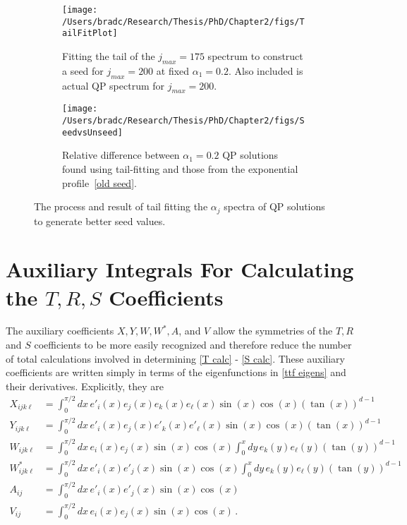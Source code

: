 \documentclass[../PhD.tex]{subfiles}
\begin{document}
\begin{subappendices}
\begin{figure}[ht]
	\centering
	\begin{subfigure}[t]{0.45\textwidth}
  		\texttt{[image: /Users/bradc/Research/Thesis/PhD/Chapter2/figs/TailFitPlot]}
  		\caption{Fitting the tail of the $j_{max} = 175$ spectrum to construct a seed for $j_{max} = 200$ at fixed $\alpha_1 = 0.2$. Also included is actual QP spectrum for $j_{max} = 200$.}
  		\label{fig: tail fitting}
	\end{subfigure}
	\;
	\begin{subfigure}[t]{0.45\textwidth}
		\texttt{[image: /Users/bradc/Research/Thesis/PhD/Chapter2/figs/SeedvsUnseed]}
		\caption{Relative difference between $\alpha_1=0.2$ QP solutions found using tail-fitting and those from the exponential profile~\eqref{old seed}.}
		\label{fig: seedvsunseed}
	\end{subfigure}
	\caption[Illustrating the tail fitting procedure]{The process and result of tail fitting the $\alpha_j$ spectra of QP solutions to generate better seed values.}
   	\label{fig: fit & resids}
\end{figure}


\section{Auxiliary Integrals For Calculating the $T, R, S$ Coefficients}
\label{app: integrals}

The auxiliary coefficients $X, Y, W, W^*, A$, and $V$ allow the symmetries of the $T, R$ and $S$ coefficients to be more easily recognized and therefore reduce the number of total calculations involved in determining \eqref{T calc} - \eqref{S calc}. These auxiliary coefficients are written simply in terms of the eigenfunctions in \eqref{ttf eigens} and their derivatives. Explicitly, they are
\begin{align}
\label{X int}
X_{ijk\ell} &= \int^{\pi/2}_0 dx \, e'_i(x) e_j(x) e_k(x) e_\ell(x) \sin(x) \cos(x) \left( \tan(x) \right)^{d-1} \\
\label{Y int}
Y_{ijk\ell} &= \int^{\pi/2}_0 dx \, e'_i(x) e_j(x) e'_k(x) e'_\ell(x) \sin(x) \cos(x) \left( \tan(x) \right)^{d-1} \\
\label{W int}
W_{ijk\ell} &= \int^{\pi/2}_0 dx \, e_i(x) e_j(x) \sin(x) \cos(x) \int^x_0 dy \, e_k(y) e_\ell(y) \left( \tan(y) \right)^{d-1} \\
\label{W* int}
W^*_{ijk\ell} &= \int^{\pi/2}_0 dx \, e'_i(x) e'_j(x) \sin(x) \cos(x) \int^x_0 dy \, e_k(y) e_\ell(y) \left( \tan(y) \right)^{d-1} \\
\label{A int}
A_{ij} &= \int^{\pi/2}_0 dx \, e'_i(x) e'_j(x) \sin(x) \cos(x) \\
\label{V int}
V_{ij} &= \int^{\pi/2}_0 dx \, e_i(x) e_j(x) \sin(x) \cos(x) \, .
\end{align}


\end{subappendices}
\end{document}
